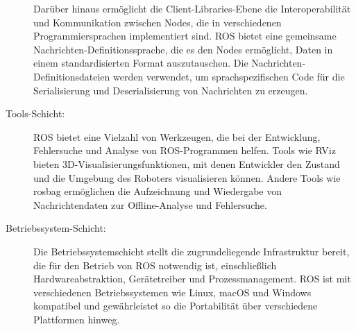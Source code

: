 \begin{description}
    Darüber hinaus ermöglicht die Client-Libraries-Ebene die Interoperabilität und Kommunikation zwischen Nodes, die in verschiedenen Programmiersprachen implementiert sind. \ac{ROS} bietet eine gemeinsame Nachrichten-Definitionssprache, die es den Nodes ermöglicht, Daten in einem standardisierten Format auszutauschen. Die Nachrichten-Definitionsdateien werden verwendet, um sprachspezifischen Code für die Serialisierung und Deserialisierung von Nachrichten zu erzeugen.
    
    \cite[vgl.][]{client-libraries}
   
    
    \item[Tools-Schicht:] ROS bietet eine Vielzahl von Werkzeugen, die bei der Entwicklung, Fehlersuche und Analyse von ROS-Programmen helfen. Tools wie RViz bieten 3D-Visualisierungsfunktionen, mit denen Entwickler den Zustand und die Umgebung des Roboters visualisieren können. Andere Tools wie rosbag ermöglichen die Aufzeichnung und Wiedergabe von Nachrichtendaten zur Offline-Analyse und Fehlersuche.
    
    \cite[vgl.][]{ros-tools}
    
    \item[Betriebssystem-Schicht:] Die Betriebssystemschicht stellt die zugrundeliegende Infrastruktur bereit, die für den Betrieb von ROS notwendig ist, einschließlich Hardwareabstraktion, Gerätetreiber und Prozessmanagement. ROS ist mit verschiedenen Betriebssystemen wie Linux, macOS und Windows kompatibel und gewährleistet so die Portabilität über verschiedene Plattformen hinweg.
    
    \cite[vgl.][]{ROSIntroduction}

\end{description}

